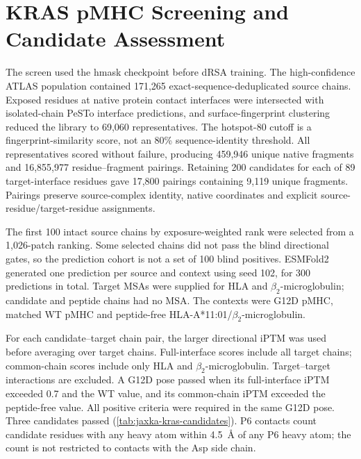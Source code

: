 \section{KRAS pMHC Screening and Candidate Assessment}
\label{app:jaxka-kras-screening}

The screen used the hmask checkpoint before dRSA training. The high-confidence ATLAS population contained 171,265 exact-sequence-deduplicated source chains. Exposed residues at native protein contact interfaces were intersected with isolated-chain PeSTo interface predictions, and surface-fingerprint clustering reduced the library to 69,060 representatives. The hotspot-80 cutoff is a fingerprint-similarity score, not an 80\% sequence-identity threshold. All representatives scored without failure, producing 459,946 unique native fragments and 16,855,977 residue--fragment pairings. Retaining 200 candidates for each of 89 target-interface residues gave 17,800 pairings containing 9,119 unique fragments. Pairings preserve source-complex identity, native coordinates and explicit source-residue/target-residue assignments.

The first 100 intact source chains by exposure-weighted rank were selected from a 1,026-patch ranking. Some selected chains did not pass the blind directional gates, so the prediction cohort is not a set of 100 blind positives. ESMFold2 generated one prediction per source and context using seed 102, for 300 predictions in total. Target MSAs were supplied for HLA and $\beta_2$-microglobulin; candidate and peptide chains had no MSA. The contexts were G12D pMHC, matched WT pMHC and peptide-free HLA-A*11:01/$\beta_2$-microglobulin.

For each candidate--target chain pair, the larger directional iPTM was used before averaging over target chains. Full-interface scores include all target chains; common-chain scores include only HLA and $\beta_2$-microglobulin. Target--target interactions are excluded. A G12D pose passed when its full-interface iPTM exceeded 0.7 and the WT value, and its common-chain iPTM exceeded the peptide-free value. All positive criteria were required in the same G12D pose. Three candidates passed (\cref{tab:jaxka-kras-candidates}). P6 contacts count candidate residues with any heavy atom within 4.5~\AA{} of any P6 heavy atom; the count is not restricted to contacts with the Asp side chain.


